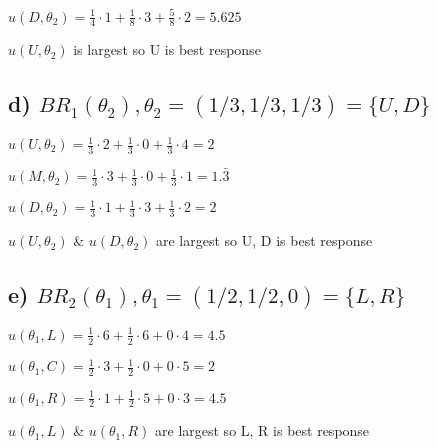 \documentclass[a4paper,11pt]{article}
\begin{document}
$u(D,\theta_2) = \frac{1}{4} \cdot 1 + \frac{1}{8} \cdot 3 + \frac{5}{8} \cdot 2 = 5.625$

$u(U,\theta_2)$ is largest so {U} is best response


\subsection*{d) $ BR_1(\theta_2), \theta_2 = (1/3, 1/3, 1/3) = \{U, D\}$}

$u(U,\theta_2) = \frac{1}{3} \cdot 2 + \frac{1}{3} \cdot 0 + \frac{1}{3} \cdot 4 = 2$

$u(M,\theta_2) = \frac{1}{3} \cdot 3 + \frac{1}{3} \cdot 0 + \frac{1}{3} \cdot 1 = 1.\bar{3}$

$u(D,\theta_2) = \frac{1}{3} \cdot 1 + \frac{1}{3} \cdot 3 + \frac{1}{3} \cdot 2 = 2$

$u(U,\theta_2)$ \& $u(D,\theta_2)$ are largest so {U, D} is best response


\subsection*{e) $ BR_2(\theta_1), \theta_1 = (1/2, 1/2, 0) = \{L, R\}$}

$u(\theta_1,L) = \frac{1}{2} \cdot 6 + \frac{1}{2} \cdot 6 + 0 \cdot 4 = 4.5$

$u(\theta_1,C) = \frac{1}{2} \cdot 3 + \frac{1}{2} \cdot 0 + 0 \cdot 5 = 2$

$u(\theta_1,R) = \frac{1}{2} \cdot 1 + \frac{1}{2} \cdot 5 + 0 \cdot 3 = 4.5$

$u(\theta_1,L)$ \& $u(\theta_1,R)$ are largest so {L, R} is best response
\end{document}
